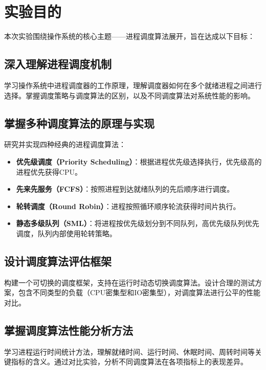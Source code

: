 \documentclass[a4paper, 12pt]{article}
\begin{document}
    {
        \hypersetup{linkcolor=black} 
        \tableofcontents
    }
    \newpage
    
    
    \section{实验目的}
    
    本次实验围绕操作系统的核心主题——进程调度算法展开，旨在达成以下目标：
    
    \subsection{深入理解进程调度机制}
    学习操作系统中进程调度器的工作原理，理解调度器如何在多个就绪进程之间进行选择。掌握调度策略与调度算法的区别，以及不同调度算法对系统性能的影响。
    
    \subsection{掌握多种调度算法的原理与实现}
    研究并实现四种经典的进程调度算法：
    \begin{itemize}[label=\textbullet, itemsep=0pt]
        \item \textbf{优先级调度（Priority Scheduling）}：根据进程优先级选择执行，优先级高的进程优先获得CPU。
        \item \textbf{先来先服务（FCFS）}：按照进程到达就绪队列的先后顺序进行调度。
        \item \textbf{轮转调度（Round Robin）}：进程按照循环顺序轮流获得时间片执行。
        \item \textbf{静态多级队列（SML）}：将进程按优先级划分到不同队列，高优先级队列优先调度，队列内部使用轮转策略。
    \end{itemize}
    
    \subsection{设计调度算法评估框架}
    构建一个可切换的调度框架，支持在运行时动态切换调度算法。设计合理的测试方案，包含不同类型的负载（CPU密集型和IO密集型），对调度算法进行公平的性能对比。
    
    \subsection{掌握调度算法性能分析方法}
    学习进程运行时间统计方法，理解就绪时间、运行时间、休眠时间、周转时间等关键指标的含义。通过对比实验，分析不同调度算法在各项指标上的表现差异。
    
\end{document}

